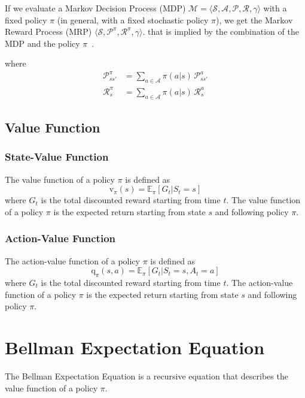 If we evaluate a Markov Decision Process (MDP)
$\mathcal{M}=\langle\mathcal{S},\mathcal{A},\mathcal{P},\mathcal{R},\gamma\rangle$
with a fixed policy $\pi$ (in general, with a fixed stochastic policy $\pi$), we get the
Markov Reward Process (MRP) $\langle \mathcal{S},\mathcal{P}^{\pi},\mathcal{R}^{\pi},\gamma\rangle$.
that is implied by the combination of the MDP and the
policy $\pi$~\cite[100]{rao-2022}.

where
\begin{align}
    \mathcal{P}^{\pi}_{ss'} &= \sum_{a\in\mathcal{A}}^{}\pi(a|s)\,\mathcal{P}_{ss'}^{a} \\
    \mathcal{R}^{\pi}_{s} &= \sum_{a\in\mathcal{A}}^{}\pi(a|s)\,\mathcal{R}_{s}^{a}
\end{align}

\subsection{Value Function}\label{subsec:value-function}

\subsubsection{State-Value Function}\label{subsubsec:state-value-function}
The value function of a policy $\pi$ is defined as
\[
    \text{v}_{\pi}(s) = \mathbb{E}_{\pi}[G_t|S_t=s]
\]
where $G_t$ is the total discounted reward starting from time $t$.
The value function of a policy $\pi$ is the expected return starting from state $s$ and following policy $\pi$.

\subsubsection{Action-Value Function}\label{subsubsec:action-value-function}
The action-value function of a policy $\pi$ is defined as
\[
    \text{q}_{\pi}(s,a) = \mathbb{E}_{\pi}[G_t|S_t=s,A_t=a]
\]
where $G_t$ is the total discounted reward starting from time $t$.
The action-value function of a policy $\pi$ is the expected return starting from state $s$ and following policy $\pi$.


\section{Bellman Expectation Equation}\label{sec:bellman-expectation-equation} %
The Bellman Expectation Equation is a recursive equation that describes the value function of a policy $\pi$.

